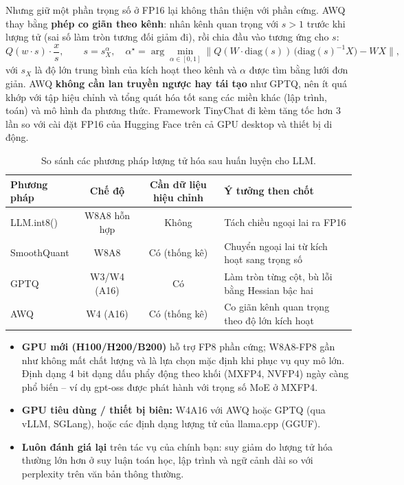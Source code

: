 Nhưng giữ một phần trọng số ở FP16 lại không thân thiện với phần cứng. AWQ thay bằng \textbf{phép co giãn theo kênh}: nhân kênh quan trọng với $s > 1$ trước khi lượng tử (sai số làm tròn tương đối giảm đi), rồi chia đầu vào tương ứng cho $s$:
\[
Q(w \cdot s)\cdot \frac{x}{s}, \qquad s = s_X^{\alpha}, \quad \alpha^\star = \arg\min_{\alpha\in[0,1]} \Big\|Q(W\cdot \text{diag}(s))\,\big(\text{diag}(s)^{-1}X\big) - WX\Big\|,
\]
với $s_X$ là độ lớn trung bình của kích hoạt theo kênh và $\alpha$ được tìm bằng lưới đơn giản. AWQ \textbf{không cần lan truyền ngược hay tái tạo} như GPTQ, nên ít quá khớp với tập hiệu chỉnh và tổng quát hóa tốt sang các miền khác (lập trình, toán) và mô hình đa phương thức. Framework TinyChat đi kèm tăng tốc hơn 3 lần so với cài đặt FP16 của Hugging Face trên cả GPU desktop và thiết bị di động.

\begin{table}[H]
\centering
\caption{So sánh các phương pháp lượng tử hóa sau huấn luyện cho LLM.}
\label{tab:llm_quant_comparison}
\begin{tabularx}{\textwidth}{@{}lccX@{}}
\toprule
\textbf{Phương pháp} & \textbf{Chế độ} & \textbf{Cần dữ liệu hiệu chỉnh} & \textbf{Ý tưởng then chốt} \\
\midrule
LLM.int8() & W8A8 hỗn hợp & Không & Tách chiều ngoại lai ra FP16 \\
SmoothQuant & W8A8 & Có (thống kê) & Chuyển ngoại lai từ kích hoạt sang trọng số \\
GPTQ & W3/W4 (A16) & Có & Làm tròn từng cột, bù lỗi bằng Hessian bậc hai \\
AWQ & W4 (A16) & Có (thống kê) & Co giãn kênh quan trọng theo độ lớn kích hoạt \\
\bottomrule
\end{tabularx}
\end{table}

\begin{tcolorbox}[title={Thực tế triển khai năm 2026}, colback=blue!5!white, colframe=blue!60!black, fonttitle=\bfseries]
\begin{itemize}
	\item \textbf{GPU mới (H100/H200/B200)} hỗ trợ FP8 phần cứng; W8A8-FP8 gần như không mất chất lượng và là lựa chọn mặc định khi phục vụ quy mô lớn. Định dạng 4 bit dạng dấu phẩy động theo khối (MXFP4, NVFP4) ngày càng phổ biến -- ví dụ gpt-oss được phát hành với trọng số MoE ở MXFP4.
	\item \textbf{GPU tiêu dùng / thiết bị biên:} W4A16 với AWQ hoặc GPTQ (qua vLLM, SGLang), hoặc các định dạng lượng tử của llama.cpp (GGUF).
	\item \textbf{Luôn đánh giá lại} trên tác vụ của chính bạn: suy giảm do lượng tử hóa thường lớn hơn ở suy luận toán học, lập trình và ngữ cảnh dài so với perplexity trên văn bản thông thường.
\end{itemize}
\end{tcolorbox}
